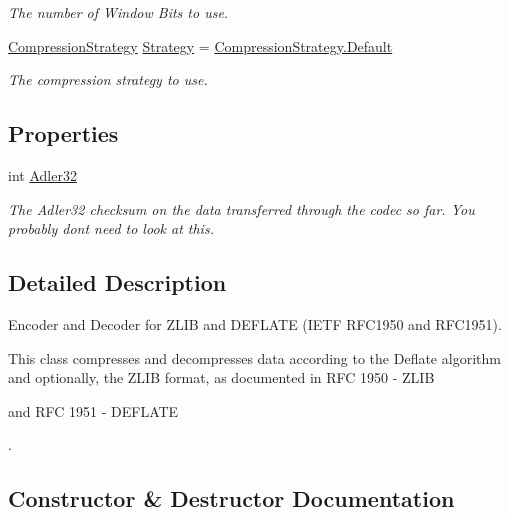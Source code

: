 \begin{DoxyCompactItemize}
\begin{DoxyCompactList}\small\item\em The number of Window Bits to use. ~\newline
\end{DoxyCompactList}\item 
\mbox{\hyperlink{namespace_super_tiled2_unity_1_1_ionic_1_1_zlib_abde5c10a1e2ee453e1e8e22e79a39a3b}{Compression\+Strategy}} \mbox{\hyperlink{class_super_tiled2_unity_1_1_ionic_1_1_zlib_1_1_zlib_codec_a3fd796243c20c482c781744e0e651519}{Strategy}} = \mbox{\hyperlink{namespace_super_tiled2_unity_1_1_ionic_1_1_zlib_a20f6771804996c363f454ad9765cd7dba7a1920d61156abc05a60135aefe8bc67}{Compression\+Strategy.\+Default}}
\begin{DoxyCompactList}\small\item\em The compression strategy to use. \end{DoxyCompactList}\end{DoxyCompactItemize}
\subsection*{Properties}
\begin{DoxyCompactItemize}
\item 
int \mbox{\hyperlink{class_super_tiled2_unity_1_1_ionic_1_1_zlib_1_1_zlib_codec_a8874d5a22e1d940e2fa5572193e378f7}{Adler32}}
\begin{DoxyCompactList}\small\item\em The Adler32 checksum on the data transferred through the codec so far. You probably don\textquotesingle{}t need to look at this. \end{DoxyCompactList}\end{DoxyCompactItemize}


\subsection{Detailed Description}
Encoder and Decoder for Z\+L\+IB and D\+E\+F\+L\+A\+TE (I\+E\+TF R\+F\+C1950 and R\+F\+C1951). 

This class compresses and decompresses data according to the Deflate algorithm and optionally, the Z\+L\+IB format, as documented in R\+FC 1950 -\/ Z\+L\+IB

and R\+FC 1951 -\/ D\+E\+F\+L\+A\+TE

. 

\subsection{Constructor \& Destructor Documentation}
\mbox{\label{class_super_tiled2_unity_1_1_ionic_1_1_zlib_1_1_zlib_codec_afb741f3d8822709c3fe17ff284d537ab}} 
